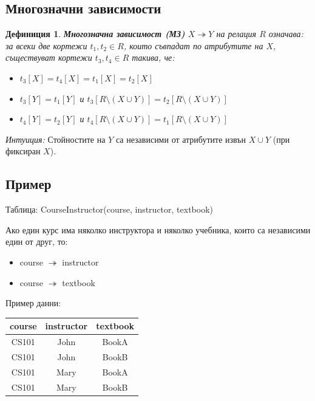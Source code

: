 \documentclass{scrartcl}
\newtheorem{definition}{Дефиниция}
\begin{document}
\begin{FlushLeft}
\section{Многозначни зависимости}

\begin{definition}
\textbf{\textit{Многозначна зависимост (МЗ)}} $X \twoheadrightarrow Y$ на релация $R$ означава: за всеки две кортежи $t_1, t_2 \in R$, които съвпадат по атрибутите на $X$, съществуват кортежи $t_3, t_4 \in R$ такива, че:

\begin{itemize}
    \item $t_3[X] = t_4[X] = t_1[X] = t_2[X]$
    \item $t_3[Y] = t_1[Y]$ и $t_3[R \setminus (X \cup Y)] = t_2[R \setminus (X \cup Y)]$
    \item $t_4[Y] = t_2[Y]$ и $t_4[R \setminus (X \cup Y)] = t_1[R \setminus (X \cup Y)]$
\end{itemize}
\end{definition}

\textit{Интуиция:} Стойностите на $Y$ са независими от атрибутите извън $X \cup Y$ (при фиксиран $X$).

\subsection{Пример}

Таблица: CourseInstructor(course, instructor, textbook)

Ако един курс има няколко инструктора и няколко учебника, които са независими един от друг, то:
\begin{itemize}
    \item course $\twoheadrightarrow$ instructor
    \item course $\twoheadrightarrow$ textbook
\end{itemize}

Пример данни:

\begin{center}
\begin{tabular}{|c|c|c|}
\hline
course & instructor & textbook \\
\hline
CS101 & John & BookA \\
CS101 & John & BookB \\
CS101 & Mary & BookA \\
CS101 & Mary & BookB \\
\hline
\end{tabular}
\end{center}


\end{FlushLeft}
\end{document}
